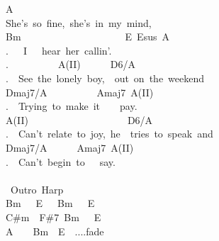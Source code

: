 {A\ \ \ \ \ \ \ \ \ \ \ \ \ \ \ \ \ \ \ \ \ \ \ \ \ \ \ \ \ \ \ \ \ \ \ \ \ \ \ \ \ \ \ \ \ \ \ \ \ \\
She's\ so\ fine,\ she's\ in\ my\ mind,\ \ \ \ \ \ \ \ \ \ \ \ \ \ \ \ \ \ \\
Bm\ \ \ \ \ \ \ \ \ \ \ \ \ \ \ \ \ \ \ \ \ E\ Esus\ A\ \ \ \ \ \ \ \ \ \ \ \ \ \ \ \ \ \ \ \ \\
.\ \ \ I\ \ \ hear\ her\ callin'.\ \ \ \ \ \ \ \ \ \ \ \ \ \ \ \ \ \ \ \ \ \ \ \ \ \ \ \ \ \\
.\ \ \ \ \ \ \ \ \ \ A(II)\ \ \ \ \ \ D6/A\ \ \ \ \ \ \ \ \ \ \ \ \ \ \ \ \ \ \ \ \ \ \ \ \ \\
.\ \ See\ the\ lonely\ boy,\ \ out\ on\ the\ weekend\ \ \ \ \ \ \ \ \ \\
Dmaj7/A\ \ \ \ \ \ \ \ \ \ Amaj7\ A(II)\ \ \ \ \ \ \ \ \ \ \ \ \ \ \ \ \ \ \ \ \ \ \\
.\ \ Trying\ to\ make\ it\ \ \ \ pay.\ \ \ \ \ \ \ \ \ \ \ \ \ \ \ \ \ \ \ \ \ \ \ \\
A(II)\ \ \ \ \ \ \ \ \ \ \ \ \ \ \ \ \ \ \ \ D6/A\ \ \ \ \ \ \ \ \ \ \ \ \ \ \ \ \ \ \ \ \ \\
.\ \ Can't\ relate\ to\ joy,\ he\ \ tries\ to\ speak\ and\ \ \ \ \ \\
Dmaj7/A\ \ \ \ \ \ Amaj7\ A(II)\ \ \ \ \ \ \ \ \ \ \ \ \ \ \ \ \ \ \ \ \ \ \ \ \ \ \\
.\ \ Can't\ begin\ to\ \ \ say.\\
\ \ \ \ \ \ \ \ \ \ \ \ \\
\lbrack\ Outro\ Harp\rbrack\ \ \ \ \ \ \ \ \ \ \ \ \ \ \ \ \ \ \ \ \\
Bm\ \ \ E\ \ \ Bm\ \ \ E\ \ \ \ \ \\
C\#m\ \ F\#7\ Bm\ \ \ E\ \ \ \ \ \\
A\ \ \ \ Bm\ \ E\ \ ....fade}
